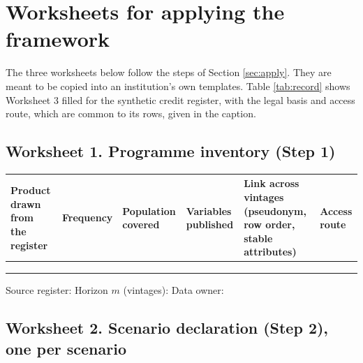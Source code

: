 \section{Worksheets for applying the framework}\label{app:worksheets}

The three worksheets below follow the steps of Section \ref{sec:apply}. They are
meant to be copied into an institution's own templates. Table \ref{tab:record}
shows Worksheet 3 filled for the synthetic credit register, with the legal basis
and access route, which are common to its rows, given in the caption.

\subsection*{Worksheet 1. Programme inventory (Step 1)}

\begin{center}
\footnotesize
\setlength{\tabcolsep}{3pt}
\begin{tabular}{@{}>{\raggedright\arraybackslash}p{2.6cm}>{\raggedright\arraybackslash}p{1.8cm}>{\raggedright\arraybackslash}p{2.4cm}>{\raggedright\arraybackslash}p{2.8cm}>{\raggedright\arraybackslash}p{3.0cm}>{\raggedright\arraybackslash}p{2.2cm}@{}}
\toprule
Product drawn from the register & Frequency & Population covered & Variables published & Link across vintages (pseudonym, row order, stable attributes) & Access route \\
\midrule
 & & & & & \\[10pt]
 & & & & & \\[10pt]
 & & & & & \\[10pt]
\bottomrule
\end{tabular}
\end{center}
\noindent Source register: \hrulefill\quad Horizon $m$ (vintages): \hrulefill\quad
Data owner: \hrulefill

\subsection*{Worksheet 2. Scenario declaration (Step 2), one per scenario}

